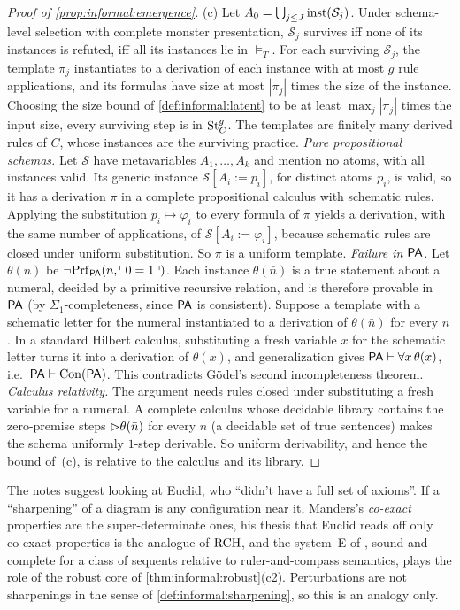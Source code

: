 \begin{proof}[Proof of \cref{prop:informal:emergence}]
(c) Let $A_0=\bigcup_{j\le J}\mathrm{inst}(\mathcal S_j)$. Under schema-level selection with complete monster presentation, $\mathcal S_j$ survives iff none of its instances is refuted, iff all its instances lie in ${\models_T}$. For each surviving $\mathcal S_j$, the template $\pi_j$ instantiates to a derivation of each instance with at most $g$ rule applications, and its formulas have size at most $|\pi_j|$ times the size of the instance. Choosing the size bound of \cref{def:informal:latent} to be at least $\max_j|\pi_j|$ times the input size, every surviving step is in $\mathrm{St}^{g}_{C}$. The templates are finitely many derived rules of $C$, whose instances are the surviving practice.
\emph{Pure propositional schemas.} Let $\mathcal S$ have metavariables $A_1,\dots,A_k$ and mention no atoms, with all instances valid. Its generic instance $\mathcal S[A_i:=p_i]$, for distinct atoms $p_i$, is valid, so it has a derivation $\pi$ in a complete propositional calculus with schematic rules. Applying the substitution $p_i\mapsto\varphi_i$ to every formula of $\pi$ yields a derivation, with the same number of applications, of $\mathcal S[A_i:=\varphi_i]$, because schematic rules are closed under uniform substitution. So $\pi$ is a uniform template.
\emph{Failure in $\mathsf{PA}$.} Let $\theta(n)$ be $\neg\mathrm{Prf}_{\mathsf{PA}}(n,\ulcorner0=1\urcorner)$. Each instance $\theta(\bar n)$ is a true statement about a numeral, decided by a primitive recursive relation, and is therefore provable in $\mathsf{PA}$ (by $\Sigma_1$-completeness, since $\mathsf{PA}$ is consistent). Suppose a template with a schematic letter for the numeral instantiated to a derivation of $\theta(\bar n)$ for every $n$. In a standard Hilbert calculus, substituting a fresh variable $x$ for the schematic letter turns it into a derivation of $\theta(x)$, and generalization gives $\mathsf{PA}\vdash\forall x\,\theta(x)$, i.e.\ $\mathsf{PA}\vdash\mathrm{Con}(\mathsf{PA})$. This contradicts Gödel's second incompleteness theorem.
\emph{Calculus relativity.} The argument needs rules closed under substituting a fresh variable for a numeral. A complete calculus whose decidable library contains the zero-premise steps $\rhd\theta(\bar n)$ for every $n$ (a decidable set of true sentences) makes the schema uniformly $1$-step derivable. So uniform derivability, and hence the bound of~(c), is relative to the calculus and its library.
\end{proof}

\begin{remark}\label{rem:informal:euclid}
The notes suggest looking at Euclid, who ``didn't have a full set of axioms''. If a ``sharpening'' of a diagram is any configuration near it, Manders's \emph{co-exact} properties \citep{manders2008euclidean} are the super-determinate ones, his thesis that Euclid reads off only co-exact properties is the analogue of $\mathrm{RCH}$, and the system~E of \citet{avigad2009formal}, sound and complete for a class of sequents relative to ruler-and-compass semantics, plays the role of the robust core of \cref{thm:informal:robust}(c2). Perturbations are not sharpenings in the sense of \cref{def:informal:sharpening}, so this is an analogy only.
\end{remark}

